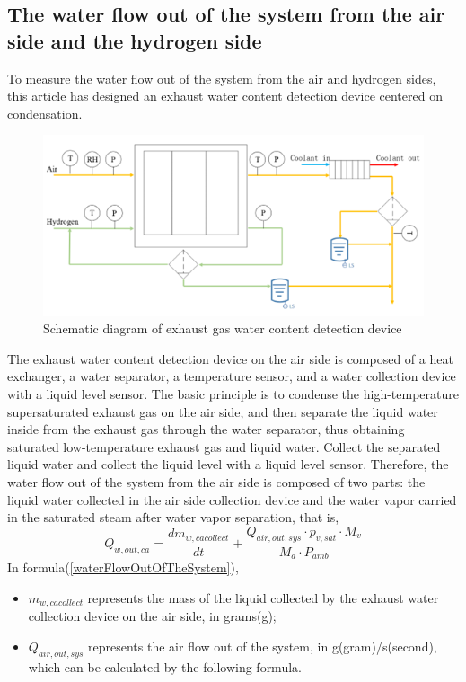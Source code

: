 \subsection*{The water flow out of the system from the air side and the hydrogen side}
To measure the water flow out of the system from the air and hydrogen sides, this article has designed an exhaust water content detection device centered on condensation.
\begin{figure}
	\centering
	\label{fig:water_detection_device_diagram}
	\includegraphics[scale=0.6]{Research_pictures/picture3.png}
	\caption[short]{Schematic diagram of exhaust gas water content detection device}
\end{figure}
The exhaust water content detection device on the air side is composed of a heat exchanger, a water separator, a temperature sensor, and a water collection device with a liquid level sensor. The basic principle is to condense the high-temperature supersaturated exhaust gas on the air side, and then separate the liquid water inside from the exhaust gas through the water separator, thus obtaining saturated low-temperature exhaust gas and liquid water. Collect the separated liquid water and collect the liquid level with a liquid level sensor.
Therefore, the water flow out of the system from the air side is composed of two parts: the liquid water collected in the air side collection device and the water vapor carried in the saturated steam after water vapor separation, that is,
\begin{equation}
	\label{waterFlowOutOfTheSystem}
	Q_{w,out,ca}={\frac{d m_{w,cacollect}}{d t}}+{\frac{Q_{air,out,sys} \cdot p_{v,sat}\cdot M_{v}}{M_{a} \cdot P_{a m b}}}
\end{equation}
In formula(\ref{waterFlowOutOfTheSystem}),
\begin{itemize}
	\item $m_{w,cacollect}$ represents the mass of the liquid collected by the exhaust water collection device on the air side, in grams(g);
	\item $Q_{air,out,sys}$ represents the air flow out of the system, in g(gram)/s(second), which can be calculated by the following formula.
\end{itemize}
